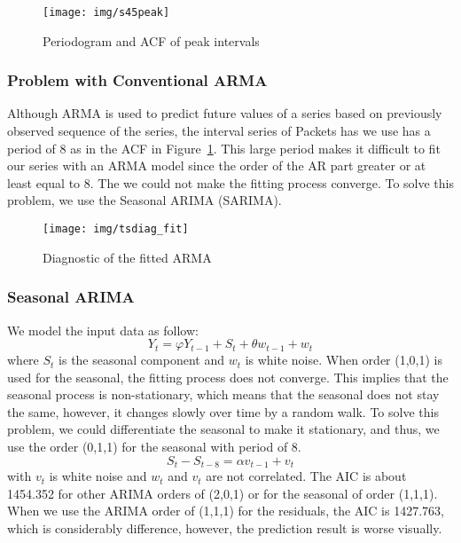 \documentclass[12pt]{article}
\begin{document}
\begin{figure}[ht!]
\centering
\texttt{[image: img/s45peak]}
\caption{Periodogram and ACF of peak intervals}\label{fig:s45peak}
\end{figure}

\subsubsection{Problem with Conventional ARMA}
Although ARMA is used to predict future values of a series based on
previously observed sequence of the series, the interval series of Packets has
we use has a period of 8 as in the ACF in Figure~\ref{fig:s45peak}. This large
period makes it difficult to fit our series with an ARMA model since the order of the AR
part greater or at least equal to 8. The we could not make the fitting process
converge. To solve this problem, we use the Seasonal ARIMA (SARIMA).

\begin{figure}[ht!]
\centering
\texttt{[image: img/tsdiag\_fit]}
\caption{Diagnostic of the fitted ARMA}\label{fig:tsdiag_fit}
\end{figure}

\subsubsection{Seasonal ARIMA}
We model the input data as follow:
\begin{equation}
Y_t = \varphi Y_{t-1}+S_t+ \theta w_{t-1}+w_t
\end{equation}
where $S_t$ is the seasonal component and $w_t$ is white noise. When order
(1,0,1) is used for the seasonal, the fitting process does not converge. This implies that the seasonal
process is non-stationary, which means that the seasonal does not
stay the same, however, it changes slowly over time by a random walk. To solve
this problem, we could differentiate the seasonal to make it stationary,
and thus, we use the order (0,1,1) for the seasonal with period of 8.
\begin{equation}
S_t - S_{t-8} = \alpha v_{t-1} + v_t
\end{equation}
with $v_t$ is white noise and $w_t$ and $v_t$ are not correlated. 
The AIC is about 1454.352 for other ARIMA orders of (2,0,1) or for the seasonal
of order (1,1,1). When we use the ARIMA order of (1,1,1) for the residuals, the
AIC is 1427.763, which is considerably difference, however, the prediction
result is worse visually. 
\end{document}
